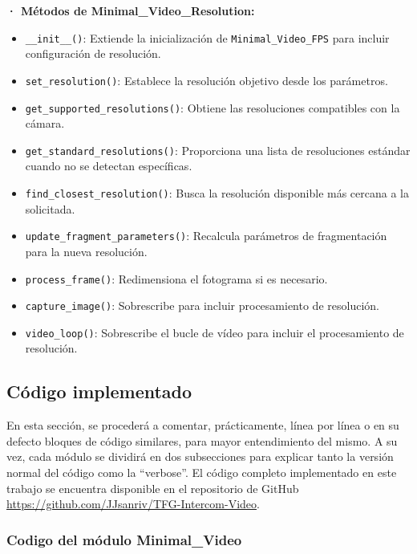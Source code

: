 \textbf{· Métodos de Minimal\_Video\_Resolution:} 
\begin{itemize} 
    \item \texttt{\_\_init\_\_()}: Extiende la inicialización de \texttt{Minimal\_Video\_FPS} para incluir configuración de resolución. 
    \item \texttt{set\_resolution()}: Establece la resolución objetivo desde los parámetros. 
    \item \texttt{get\_supported\_resolutions()}: Obtiene las resoluciones compatibles con la cámara. 
    \item \texttt{get\_standard\_resolutions()}: Proporciona una lista de resoluciones estándar cuando no se detectan específicas. 
    \item \texttt{find\_closest\_resolution()}: Busca la resolución disponible más cercana a la solicitada. 
    \item \texttt{update\_fragment\_parameters()}: Recalcula parámetros de fragmentación para la nueva resolución. 
    \item \texttt{process\_frame()}: Redimensiona el fotograma si es necesario. 
    \item \texttt{capture\_image()}: Sobrescribe para incluir procesamiento de resolución. 
    \item \texttt{video\_loop()}: Sobrescribe el bucle de vídeo para incluir el procesamiento de resolución.
\end{itemize}

\newpage

\subsection{Código implementado}
En esta sección, se procederá a comentar, prácticamente, línea por línea o en su defecto bloques de código similares, para mayor entendimiento del mismo. A su vez, cada módulo se dividirá en dos subsecciones para explicar tanto la versión normal del código como la ``verbose''. El código completo implementado en este trabajo se encuentra disponible en el repositorio de GitHub \url{https://github.com/JJsanriv/TFG-Intercom-Video}.

\subsubsection{Codigo del módulo Minimal\_Video}

